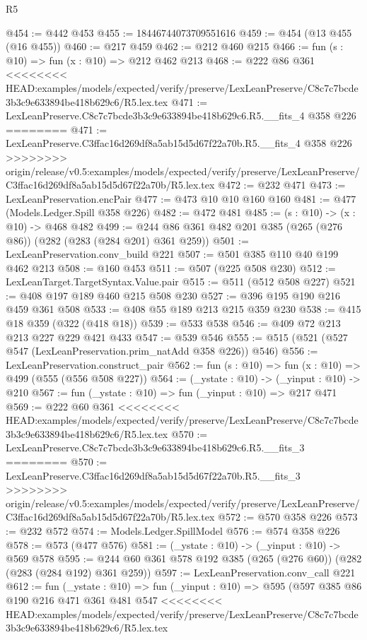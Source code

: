 \begin{lexlean}{R5}
\begin{coremodule}
{{{{{{{{{{{{{@454 := @442 @453
@455 := 18446744073709551616
@459 := @454 (@13 @455 (@16 @455))
@460 := @217 @459
@462 := @212 @460 @215
@466 := fun (s : @10) => fun (x : @10) => @212 @462 @213
@468 := @222 @86 @361
<<<<<<<< HEAD:examples/models/expected/verify/preserve/LexLeanPreserve/C8c7c7bcde3b3c9e633894be418b629c6/R5.lex.tex
@471 := LexLeanPreserve.C8c7c7bcde3b3c9e633894be418b629c6.R5.__fits_4 @358 @226
========
@471 := LexLeanPreserve.C3ffac16d269df8a5ab15d5d67f22a70b.R5.__fits_4 @358 @226
>>>>>>>> origin/release/v0.5:examples/models/expected/verify/preserve/LexLeanPreserve/C3ffac16d269df8a5ab15d5d67f22a70b/R5.lex.tex
@472 := @232 @471
@473 := LexLeanPreservation.encPair
@477 := @473 @10 @10 @160 @160
@481 := @477 (Models.Ledger.Spill @358 @226)
@482 := @472 @481
@485 := (s : @10) -> (x : @10) -> @468 @482
@499 := @244 @86 @361 @482 @201 @385 (@265 (@276 @86)) (@282 (@283 (@284 @201) @361 @259))
@501 := LexLeanPreservation.conv_build @221
@507 := @501 @385 @110 @40 @199 @462 @213
@508 := @160 @453
@511 := @507 (@225 @508 @230)
@512 := LexLeanTarget.TargetSyntax.Value.pair
@515 := @511 (@512 @508 @227)
@521 := @408 @197 @189 @460 @215 @508 @230
@527 := @396 @195 @190 @216 @459 @361 @508
@533 := @408 @55 @189 @213 @215 @359 @230
@538 := @415 @18 @359 (@322 (@418 @18))
@539 := @533 @538
@546 := @409 @72 @213 @213 @227 @229 @421 @433
@547 := @539 @546
@555 := @515 (@521 (@527 @547 (LexLeanPreservation.prim_natAdd @358 @226)) @546)
@556 := LexLeanPreservation.construct_pair
@562 := fun (s : @10) => fun (x : @10) => @499 (@555 (@556 @508 @227))
@564 := (_ystate : @10) -> (_yinput : @10) -> @210
@567 := fun (_ystate : @10) => fun (_yinput : @10) => @217 @471
@569 := @222 @60 @361
<<<<<<<< HEAD:examples/models/expected/verify/preserve/LexLeanPreserve/C8c7c7bcde3b3c9e633894be418b629c6/R5.lex.tex
@570 := LexLeanPreserve.C8c7c7bcde3b3c9e633894be418b629c6.R5.__fits_3
========
@570 := LexLeanPreserve.C3ffac16d269df8a5ab15d5d67f22a70b.R5.__fits_3
>>>>>>>> origin/release/v0.5:examples/models/expected/verify/preserve/LexLeanPreserve/C3ffac16d269df8a5ab15d5d67f22a70b/R5.lex.tex
@572 := @570 @358 @226
@573 := @232 @572
@574 := Models.Ledger.SpillModel
@576 := @574 @358 @226
@578 := @573 (@477 @576)
@581 := (_ystate : @10) -> (_yinput : @10) -> @569 @578
@595 := @244 @60 @361 @578 @192 @385 (@265 (@276 @60)) (@282 (@283 (@284 @192) @361 @259))
@597 := LexLeanPreservation.conv_call @221
@612 := fun (_ystate : @10) =>
  fun (_yinput : @10) =>
  @595
    (@597
      @385
      @86
      @190
      @216
      @471
      @361
      @481
      @547
<<<<<<<< HEAD:examples/models/expected/verify/preserve/LexLeanPreserve/C8c7c7bcde3b3c9e633894be418b629c6/R5.lex.tex
}}}}}}}}}}}}}
\end{coremodule}
\end{lexlean}
